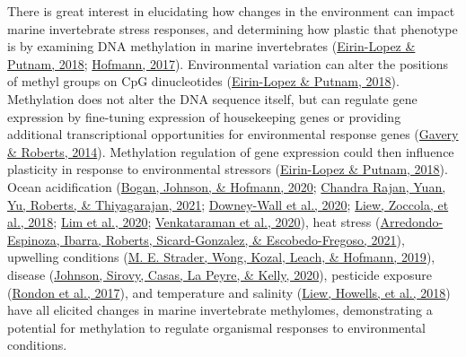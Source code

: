 \documentclass [11pt, proquest] {uwthesis}[2015/03/03]
\begin{document}
There is great interest in elucidating how changes in the environment can impact marine invertebrate stress responses, and determining how plastic that phenotype is by examining DNA methylation in marine invertebrates (\protect\hyperlink{ref-Eirin-Lopez2018}{Eirin-Lopez \& Putnam, 2018}; \protect\hyperlink{ref-Hofmann2017}{Hofmann, 2017}). Environmental variation can alter the positions of methyl groups on CpG dinucleotides (\protect\hyperlink{ref-Eirin-Lopez2018}{Eirin-Lopez \& Putnam, 2018}). Methylation does not alter the DNA sequence itself, but can regulate gene expression by fine-tuning expression of housekeeping genes or providing additional transcriptional opportunities for environmental response genes (\protect\hyperlink{ref-Gavery2014}{Gavery \& Roberts, 2014}). Methylation regulation of gene expression could then influence plasticity in response to environmental stressors (\protect\hyperlink{ref-Eirin-Lopez2018}{Eirin-Lopez \& Putnam, 2018}). Ocean acidification (\protect\hyperlink{ref-Bogan2020}{Bogan, Johnson, \& Hofmann, 2020}; \protect\hyperlink{ref-ChandraRajan2021}{Chandra Rajan, Yuan, Yu, Roberts, \& Thiyagarajan, 2021}; \protect\hyperlink{ref-Downey-Wall2020}{Downey-Wall et al., 2020}; \protect\hyperlink{ref-Liew2018b}{Liew, Zoccola, et al., 2018}; \protect\hyperlink{ref-Lim2020}{Lim et al., 2020}; \protect\hyperlink{ref-Venkataraman2020}{Venkataraman et al., 2020}), heat stress (\protect\hyperlink{ref-Arredondo-Espinoza2021}{Arredondo-Espinoza, Ibarra, Roberts, Sicard-Gonzalez, \& Escobedo-Fregoso, 2021}), upwelling conditions (\protect\hyperlink{ref-Strader2019}{M. E. Strader, Wong, Kozal, Leach, \& Hofmann, 2019}), disease (\protect\hyperlink{ref-Johnson2020}{Johnson, Sirovy, Casas, La Peyre, \& Kelly, 2020}), pesticide exposure (\protect\hyperlink{ref-Rondon2017}{Rondon et al., 2017}), and temperature and salinity (\protect\hyperlink{ref-Liew2018a}{Liew, Howells, et al., 2018}) have all elicited changes in marine invertebrate methylomes, demonstrating a potential for methylation to regulate organismal responses to environmental conditions.
\end{document}
